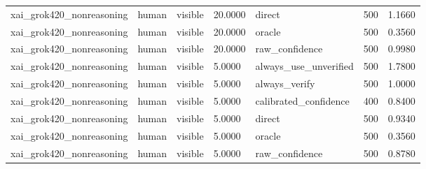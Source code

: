 \begin{tabular}{lllllll}
xai\_grok420\_nonreasoning & human & visible & 20.0000 & direct & 500 & 1.1660 \\
xai\_grok420\_nonreasoning & human & visible & 20.0000 & oracle & 500 & 0.3560 \\
xai\_grok420\_nonreasoning & human & visible & 20.0000 & raw\_confidence & 500 & 0.9980 \\
xai\_grok420\_nonreasoning & human & visible & 5.0000 & always\_use\_unverified & 500 & 1.7800 \\
xai\_grok420\_nonreasoning & human & visible & 5.0000 & always\_verify & 500 & 1.0000 \\
xai\_grok420\_nonreasoning & human & visible & 5.0000 & calibrated\_confidence & 400 & 0.8400 \\
xai\_grok420\_nonreasoning & human & visible & 5.0000 & direct & 500 & 0.9340 \\
xai\_grok420\_nonreasoning & human & visible & 5.0000 & oracle & 500 & 0.3560 \\
xai\_grok420\_nonreasoning & human & visible & 5.0000 & raw\_confidence & 500 & 0.8780 \\
\bottomrule
\end{tabular}
